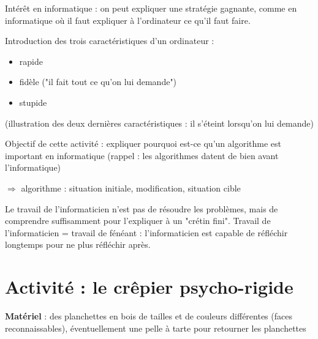 \documentclass{article}
\newcommand{\titre}[1]{\medskip\noindent\textbf{#1} : }
\newcommand{\materiel}{\titre{Matériel}}
\begin{document}
Intérêt en informatique : on peut expliquer une stratégie gagnante, comme en informatique où il faut expliquer à l'ordinateur ce qu'il faut faire.

Introduction des trois caractéristiques d'un ordinateur : 
\begin{itemize}
\item rapide 
\item fidèle ("il fait tout ce qu'on lui demande")
\item stupide
\end{itemize}
(illustration des deux dernières caractéristiques : il s'éteint lorsqu'on lui demande)

Objectif de cette activité : expliquer pourquoi est-ce qu'un algorithme est important en informatique (rappel : les algorithmes datent de bien avant l'informatique)

$\Rightarrow$ algorithme : situation initiale, modification, situation cible

Le travail de l'informaticien n'est pas de résoudre les problèmes, mais de comprendre suffisamment pour l'expliquer à un "crétin fini".
Travail de l'informaticien = travail de fénéant : l'informaticien est capable de réfléchir longtemps pour ne plus réfléchir après.




\section{Activité : le crêpier psycho-rigide}
\materiel des planchettes en bois de tailles et de couleurs différentes (faces reconnaissables), éventuellement une pelle à tarte pour retourner les planchettes
\end{document}
